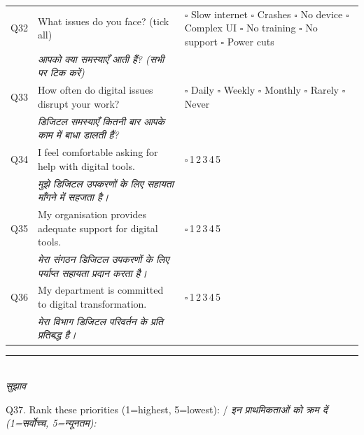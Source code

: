 \documentclass[10pt,a4paper]{article}
\newcommand{\likert}{{\Large$\square$}\,1\quad{\Large$\square$}\,2\quad{\Large$\square$}\,3\quad{\Large$\square$}\,4\quad{\Large$\square$}\,5}
\begin{document}
\noindent\begin{tabularx}{\textwidth}{@{}L{0.8cm} X L{5.2cm}@{}}
Q32 & What issues do you face? (tick all) & {\Large$\square$} Slow internet {\Large$\square$} Crashes {\Large$\square$} No device {\Large$\square$} Complex UI {\Large$\square$} No training {\Large$\square$} No support {\Large$\square$} Power cuts \\
 & {\hindifont\small\itshape\color{black!70} आपको क्या समस्याएँ आती हैं? (सभी पर टिक करें)} & \\[3pt]
Q33 & How often do digital issues disrupt your work? & {\Large$\square$} Daily {\Large$\square$} Weekly {\Large$\square$} Monthly {\Large$\square$} Rarely {\Large$\square$} Never \\
 & {\hindifont\small\itshape\color{black!70} डिजिटल समस्याएँ कितनी बार आपके काम में बाधा डालती हैं?} & \\[3pt]
Q34 & I feel comfortable asking for help with digital tools. & \likert \\
 & {\hindifont\small\itshape\color{black!70} मुझे डिजिटल उपकरणों के लिए सहायता माँगने में सहजता है।} & \\[3pt]
Q35 & My organisation provides adequate support for digital tools. & \likert \\
 & {\hindifont\small\itshape\color{black!70} मेरा संगठन डिजिटल उपकरणों के लिए पर्याप्त सहायता प्रदान करता है।} & \\[3pt]
Q36 & My department is committed to digital transformation. & \likert \\
 & {\hindifont\small\itshape\color{black!70} मेरा विभाग डिजिटल परिवर्तन के प्रति प्रतिबद्ध है।} & \\[3pt]
\end{tabularx}
\vspace{4pt}
\noindent\rule{\textwidth}{0.3pt}\vspace{3pt}
\\
{\hindifont\itshape\color{black!70} सुझाव}\vspace{3pt}

\noindent Q37. Rank these priorities (1=highest, 5=lowest): / {\hindifont\small\itshape\color{black!70} इन प्राथमिकताओं को क्रम दें (1=सर्वोच्च, 5=न्यूनतम):}\vspace{3pt}
\end{document}
